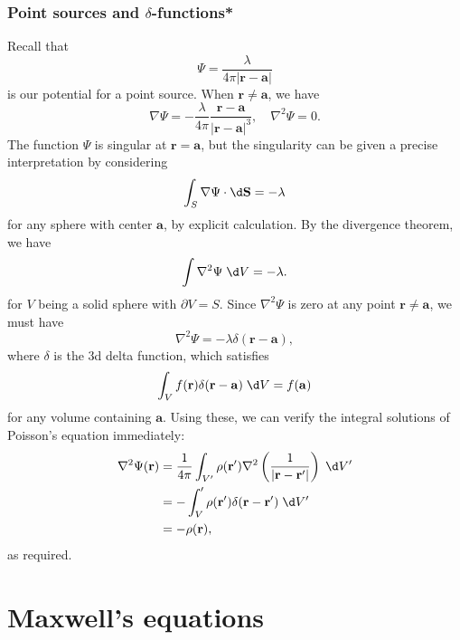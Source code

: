 \documentclass[a4paper]{article}
\begin{document}
\subsubsection{Point sources and \texorpdfstring{$\delta$}{delta}-functions*}
Recall that
\[
  \Psi = \frac{\lambda}{4\pi |\mathbf{r} - \mathbf{a}|}
\]
is our potential for a point source. When $\mathbf{r}\not = \mathbf{a}$, we have
\[
  \nabla \Psi = -\frac{\lambda}{4\pi}\frac{\mathbf{r} - \mathbf{a}}{|\mathbf{r} - \mathbf{a}|^3},\quad\nabla^2\Psi = 0.
\]
The function $\Psi$ is singular at $\mathbf{r} = \mathbf{a}$, but the singularity can be given a precise interpretation by considering 
\[
  \int_S \nabla \Psi\cdot \d \mathbf{S} = -\lambda
\]
for any sphere with center $\mathbf{a}$, by explicit calculation. By the divergence theorem, we have
\[
  \int \nabla^2\Psi \;\d V = -\lambda.
\]
for $V$ being a solid sphere with $\partial V = S$. Since $\nabla^2\Psi$ is zero at any point $\mathbf{r} \not = \mathbf{a}$, we must have
\[
  \nabla^2\Psi = -\lambda \delta(\mathbf{r} - \mathbf{a}),
\]
where $\delta$ is the 3d delta function, which satisfies
\[
  \int_V f(\mathbf{r}) \delta (\mathbf{r} - \mathbf{a})\;\d V = f(\mathbf{a})
\]
for any volume containing $\mathbf{a}$. Using these, we can verify the integral solutions of Poisson's equation immediately:
\begin{align*}
  \nabla^2 \Psi(\mathbf{r}) &= \frac{1}{4\pi}\int_{V'} \rho(\mathbf{r}')\nabla^2\left(\frac{1}{|\mathbf{r} - \mathbf{r}'|}\right)\;\d V'\\
  &= -\int_V' \rho(\mathbf{r}') \delta(\mathbf{r} - \mathbf{r}')\;\d V'\\
  &= -\rho (\mathbf{r}),
\end{align*}
as required.
\section{Maxwell's equations}
\end{document}
